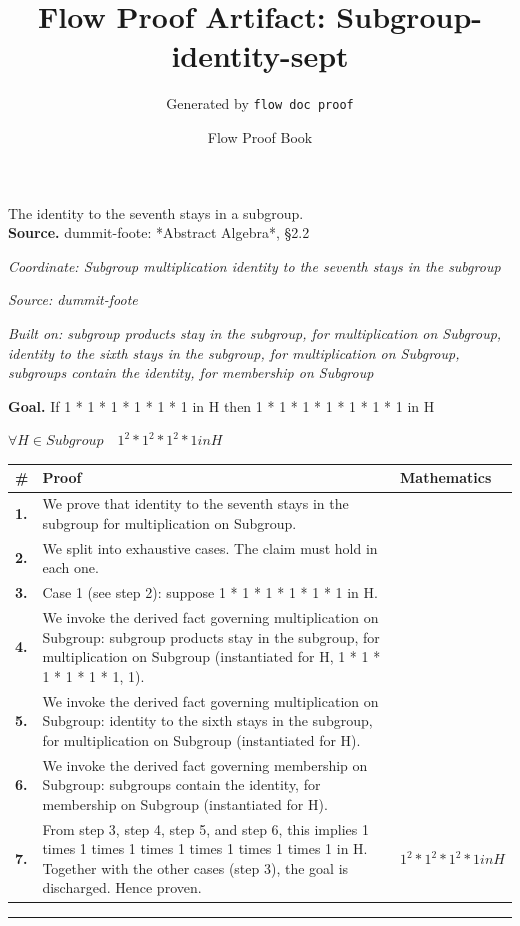 \documentclass[11pt]{article}
\title{Flow Proof Artifact: Subgroup-identity-sept}
\author{Generated by \texttt{flow doc proof}}
\date{Flow Proof Book}
\theoremstyle{definition}
\begin{document}
\maketitle
The identity to the seventh stays in a subgroup.\\[0.5em]
\textbf{Source.} dummit-foote: *Abstract Algebra*, §2.2\\[0.5em]
\bigskip
{}\par
\smallskip\noindent\textit{Coordinate: Subgroup \cdot multiplication \cdot identity to the seventh stays in the subgroup}\par
\smallskip\noindent\textit{Source: dummit-foote}\par
\smallskip\noindent\textit{Built on: subgroup products stay in the subgroup, for multiplication on Subgroup, identity to the sixth stays in the subgroup, for multiplication on Subgroup, subgroups contain the identity, for membership on Subgroup}\par
\medskip
\noindent\textbf{Goal.} If 1 * 1 * 1 * 1 * 1 * 1 in H then 1 * 1 * 1 * 1 * 1 * 1 * 1 in H\par
\noindent$\displaystyle \forall H \in Subgroup\quad 1^{2} * 1^{2} * 1^{2} * 1 in H$\par
\medskip
\noindent
\begin{tabular}{@{} >{\raggedright\arraybackslash}p{} >{\raggedright\arraybackslash}p{} >{\raggedleft\arraybackslash}p{} @{}}
\textbf{\#} & \textbf{Proof} & \textbf{Mathematics} \\
\midrule
\textbf{1.} & We prove that identity to the seventh stays in the subgroup for multiplication on Subgroup. & \\[0.45em]
\textbf{2.} & We split into exhaustive cases. The claim must hold in each one. & \\[0.45em]
\textbf{3.} & Case 1 (see step 2): suppose 1 * 1 * 1 * 1 * 1 * 1 in H. & \\[0.45em]
\textbf{4.} & We invoke the derived fact governing multiplication on Subgroup: subgroup products stay in the subgroup, for multiplication on Subgroup (instantiated for H, 1 * 1 * 1 * 1 * 1 * 1, 1). & \\[0.45em]
\textbf{5.} & We invoke the derived fact governing multiplication on Subgroup: identity to the sixth stays in the subgroup, for multiplication on Subgroup (instantiated for H). & \\[0.45em]
\textbf{6.} & We invoke the derived fact governing membership on Subgroup: subgroups contain the identity, for membership on Subgroup (instantiated for H). & \\[0.45em]
\textbf{7.} & From step 3, step 4, step 5, and step 6, this implies 1 times 1 times 1 times 1 times 1 times 1 times 1 in H. Together with the other cases (step 3), the goal is discharged. Hence proven. & $\displaystyle 1^{2} * 1^{2} * 1^{2} * 1 in H$ \\[0.45em]
\bottomrule
\end{tabular}
\label{thm:Subgroup-multiplication-identity_to_the_seventh_stays_in_the_subgroup}
\par\medskip\hrule
\end{document}
